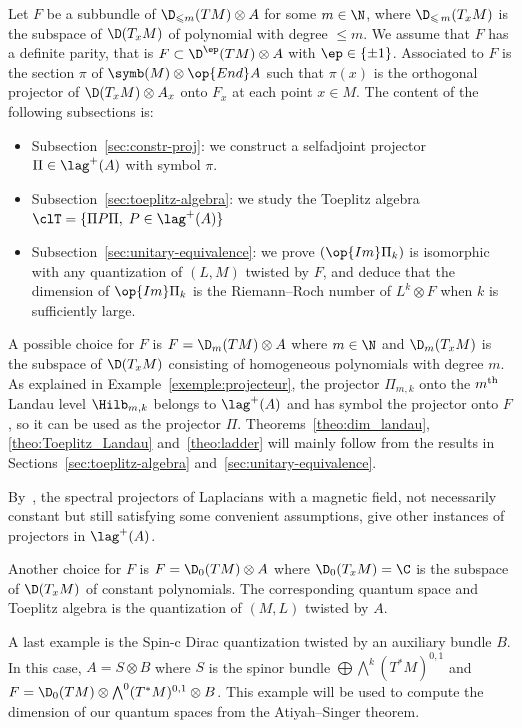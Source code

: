 Let $F$ be a subbundle of $\D_{\leqslant m}(TM)
\otimes A$ for some $m \in \N$, where $\D_{\leqslant\,m} (T_xM)$ is the subspace of $\D(T_xM)$ of polynomial with degree $\leqslant m$. We assume that $F$ has a definite parity, that is $F \subset \D ^\ep (TM) \otimes A$ with $\ep \in \{\pm 1\}$. Associated to $F$ is the section $\pi$ of $\symb (M) \otimes \op{End} A$ such that $\pi(x)$ is the orthogonal projector of $\D(T_xM) \otimes A_x$ onto $F_x$ at each point $x \in M$. The content of the following subsections is:
\begin{itemize}
\item[-] Subsection~\ref{sec:constr-proj}: we construct a selfadjoint projector $\Pi \in \lag ^+(A)$ with symbol $\pi$.
\item[-] Subsection~\ref{sec:toeplitz-algebra}: we study the Toeplitz algebra $ \clT = \{ \Pi P \Pi, \; P \in \lag^{+} (A) \} $
\item[-] Subsection~\ref{sec:unitary-equivalence}: we prove $(
\op{Im} \Pi_k)$ is isomorphic with any quantization of $(L,M)$ twisted by $F$, and deduce that the dimension of $ \op{Im} \Pi_k$ is the Riemann--Roch number of $L^k \otimes F$ when $k$ is sufficiently large.
\end{itemize}

A possible choice for $F$ is $F = \D_m (TM)\otimes A $ where $m\in \N$ and $\D_m (T_xM)$ is the subspace of $\D (T_xM)$ consisting of homogeneous polynomials with degree $m$. As explained in Example~\ref{exemple:projecteur}, the projector $\Pi_{m,k}$ onto the $m^{\rm th}$ Landau level $\Hilb_{m,k}$ belongs to $\lag^+ (A)$ and has symbol the projector onto $F$, so it can be used as the projector $\Pi$. Theorems~\ref{theo:dim_landau}, \ref{theo:Toeplitz_Landau} and~\ref{theo:ladder} will mainly follow from the results in Sections~\ref{sec:toeplitz-algebra} and~\ref{sec:unitary-equivalence}.

By~\cite{oim_copain}, the spectral projectors of Laplacians with a magnetic field, not necessarily constant but still satisfying some convenient assumptions, give other instances of projectors in $\lag ^+(A)$.

Another choice for $F$ is $F = \D_0 (TM) \otimes A$ where $\D_0 (T_xM) =\C$ is the subspace of $\D (T_xM)$ of constant polynomials. The corresponding quantum space and Toeplitz algebra is the quantization of $(M,L)$ twisted by $A$.

A last example is the Spin-c Dirac quantization twisted by an auxiliary bundle $B$. In this case, $A = S \otimes B$ where $S$ is the spinor bundle  $\bigoplus \bigwedge^k (T^*M)^{0,1} $ and $F = \D_0(TM)
\otimes \bigwedge^0 (T^*M)^{0,1} \otimes B$.  This example will be used to compute the dimension of our quantum spaces from the Atiyah--Singer theorem.



